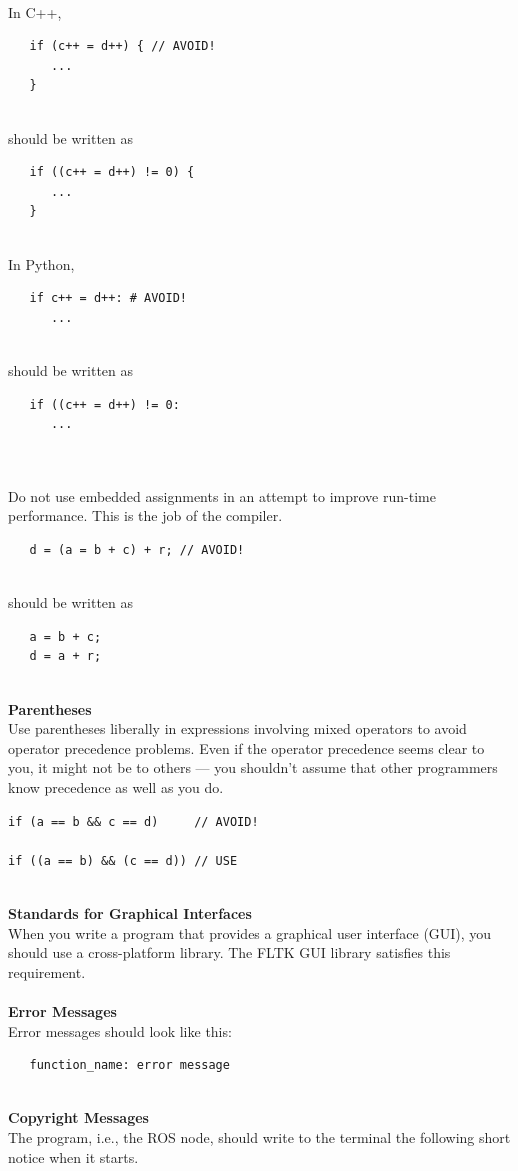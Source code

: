 \documentclass{CSSRforAfrica}
\newcommand{\blank}{~\\}
\begin{document}
\begin{appendices}
\blank
In C++,
{\small
\begin{verbatim}
   if (c++ = d++) { // AVOID!  
      ...
   }
\end{verbatim}
}
\blank
should be written as
{\small
\begin{verbatim}
   if ((c++ = d++) != 0) {
      ...
   }
\end{verbatim}
}

\blank
In Python,
{\small
\begin{verbatim}
   if c++ = d++: # AVOID!  
      ...

\end{verbatim}
}
\blank
should be written as
{\small
\begin{verbatim}
   if ((c++ = d++) != 0:
      ...
 
\end{verbatim}
}
\blank
Do not use embedded assignments in an attempt to improve run-time performance. This is the
job of the compiler.  

{\small
\begin{verbatim}
   d = (a = b + c) + r; // AVOID!
\end{verbatim}
}
\blank
should be written as

{\small
\begin{verbatim}
   a = b + c;
   d = a + r;
\end{verbatim}
}
\blank
{\bf Parentheses}\\
Use parentheses liberally in expressions involving mixed operators
to avoid operator precedence problems. Even if the operator precedence seems clear to you, it
might not be to others --- you shouldn't assume that other programmers know precedence as
well as you do.
{\small
\begin{verbatim}
if (a == b && c == d)     // AVOID!

if ((a == b) && (c == d)) // USE
\end{verbatim}
}
\blank
{\bf Standards for Graphical Interfaces}\\
When you write a program that provides a graphical user interface (GUI), 
you should use a cross-platform library.  
The FLTK GUI library \cite{fltk} satisfies this requirement.
\blank
~
\blank
{\bf Error Messages}\\
Error messages should look like this:
{\small
\begin{verbatim}
   function_name: error message
\end{verbatim}
} 
\newpage
\blank
{\bf Copyright Messages}\\
The program, i.e., the ROS node, should write to the terminal the following short notice when it starts.


\end{appendices}
\end{document}
